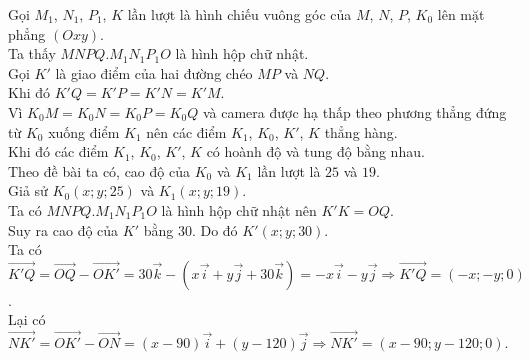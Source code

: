 \begin{bt}
{\begin{center}
{
			} 
		\end{center}
		Gọi $M_1$, $N_1$, $P_1$, $K$ lần lượt là  hình chiếu vuông góc của $M$, $N$, $P$, $K_0$ lên mặt phẳng $\left(Oxy \right)$.\\
		Ta  thấy $MNPQ. M_1N_1P_1O$ là hình hộp chữ nhật.\\
		Gọi $K'$ là giao  điểm của hai đường chéo $MP$ và $NQ$.\\
		 Khi đó $K'Q = K'P = K'N = K'M$.\\
		Vì $K_0M = K_0N = K_0P = K_0Q$ và camera được hạ thấp theo phương thẳng đứng từ $K_0$ xuống điểm $K_1$ nên các  điểm $K_1$, $K_0$, $K'$, $K$ thẳng hàng.\\
		Khi đó các điểm $K_1$, $K_0$, $K'$, $K$ có hoành độ và tung độ bằng nhau.\\ 
		Theo đề bài ta có, cao độ của $K_0$ và $K_1$ lần  lượt là $25$ và $19$.\\
		Giả  sử $K_0 \left(x; y; 25 \right)$ và $K_1\left(x; y; 19 \right)$.\\
		Ta có $MNPQ. M_1N_1P_1O$ là hình  hộp chữ nhật nên $K'K = OQ$.\\
		Suy ra cao  độ của $K'$ bằng $30$. Do đó $K'\left(x; y; 30 \right)$.\\
		Ta có $\overrightarrow{K'Q} = \overrightarrow{OQ} - \overrightarrow{OK'} = 30\overrightarrow{k} - \left(x\overrightarrow{i} + y\overrightarrow{j}+30\overrightarrow{k} \right) = -x\overrightarrow{i} - y\overrightarrow{j} \Rightarrow \overrightarrow{K'Q} =  \left(-x; -y; 0 \right)$.\\
		Lại có $\overrightarrow{NK'} = \overrightarrow{OK'} - \overrightarrow{ON} = \left(x-90 \right) \overrightarrow{i} + \left(y-120 \right) \overrightarrow{j} \Rightarrow \overrightarrow{NK'}  = \left(x-90; y-120; 0 \right)$.\\
}
\end{bt}
